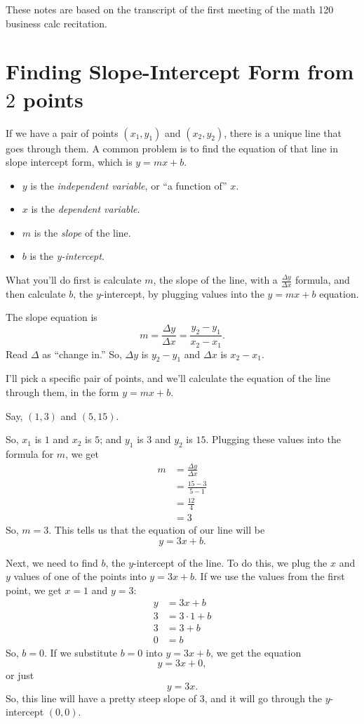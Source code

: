 \documentclass[12pt]{article}
\begin{document}
\par These notes are based on the transcript of the first meeting of the math 120 business calc recitation. 
\section{Finding Slope-Intercept Form from $2$ points} 
\par If we have a pair of points $(x_1, y_1)$ and $(x_2, y_2)$, there is a unique line that goes through them. A common problem is to find the equation of that line in slope intercept form, which is $y = mx + b$.
\begin{itemize}
\item $y$ is the \textit{independent variable}, or ``a function of'' $x$.
\item $x$ is the \textit{dependent variable}.
\item $m$ is the \textit{slope} of the line.
\item $b$ is the \textit{y-intercept}.
\end{itemize}
What you'll do first is calculate $m$, the slope of the line, with a $\frac{\Delta y}{\Delta x}$ formula, and then calculate $b$, the $y$-intercept, by plugging values into the $y = mx + b$ equation.
\par The slope equation is
\[ m = \frac{\Delta y}{\Delta x} = \frac{y_2 - y_1}{x_2 - x_1}.\]
Read $\Delta$ as ``change in.'' So, $\Delta y$ is $y_2 - y_1$ and $\Delta x$ is $x_2 - x_1$.
\par I'll pick a specific pair of points, and we'll calculate the equation of the line through them, in the form $y = mx + b$.
\par Say, $(1, 3)$ and $(5, 15)$.
\par So, $x_1$ is $1$ and $x_2$ is $5$; and $y_1$ is $3$ and $y_2$ is $15$. Plugging these values into the formula for $m$, we get
\begin{align*}
m &= \frac{\Delta y}{ \Delta x}\\
&= \frac{15 - 3}{5 - 1}\\
&= \frac{12}{4}\\
&= 3
\end{align*}
So, $m = 3$. This tells us that the equation of our line will be \[y = 3x + b.\] 
\par Next, we need to find $b$, the $y$-intercept of the line. To do this, we plug the $x$ and $y$ values of one of the points into $y = 3x + b$. If we use the values from the first point, we get $x = 1$ and $y = 3$:
\begin{align*}
 y &= 3x + b\\
3 &= 3 \cdot 1 + b\\
3 &= 3 + b\\
0 &= b
\end{align*}
So, $b = 0$. If we substitute $b = 0$ into $y = 3x + b$, we get the equation
\[ y = 3x + 0,\]
or just
\[y = 3x.\]
So, this line will have a pretty steep slope of $3$, and it will go through the $y$-intercept $(0,0)$.
\end{document}
